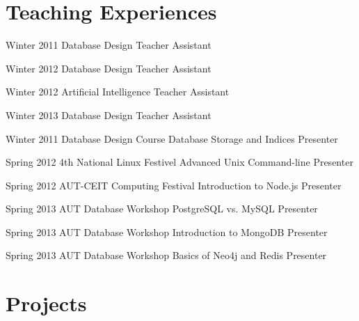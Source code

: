 \documentclass{tccv}
\begin{document}
\section{Teaching Experiences}

\begin{teaching}


\item{Winter 2011}
	 {}
	 {Database Design}
	 {Teacher Assistant}


\item{Winter 2012}
	 {}
	 {Database Design}
	 {Teacher Assistant}


\item{Winter 2012}
	 {}
	 {Artificial Intelligence}
	 {Teacher Assistant}


\item{Winter 2013}
	 {}
	 {Database Design}
	 {Teacher Assistant}



\item{Winter 2011}
	 {Database Design Course}
	 {Database Storage and Indices}
	 {Presenter}


\item{Spring 2012}
	 {4th National Linux Festivel}
	 {Advanced Unix Command-line}
	 {Presenter}


\item{Spring 2012}
	 {AUT-CEIT Computing Festival}
	 {Introduction to Node.js}
	 {Presenter}


\item{Spring 2013}
	 {AUT Database Workshop}
	 {PostgreSQL vs. MySQL}
	 {Presenter}


\item{Spring 2013}
	 {AUT Database Workshop}
	 {Introduction to MongoDB}
	 {Presenter}


\item{Spring 2013}
	 {AUT Database Workshop}
	 {Basics of Neo4j and Redis}
	 {Presenter}

\end{teaching}










\section{Projects}
\end{document}
